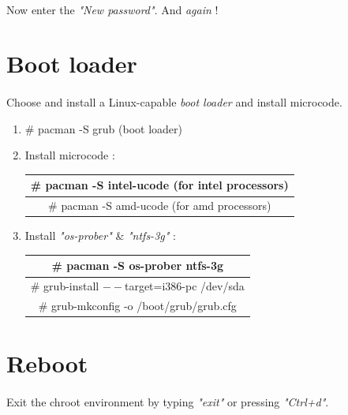 \documentclass[12pt, a4paper]{article}
\begin{document}
\paragraph{}
Now enter the \emph{"New password"}. And \emph{again} !

\section{Boot loader}
\paragraph{}
Choose and install a Linux-capable \textit{boot loader} and install microcode.
\begin{enumerate}
	\item \# pacman -S grub (boot loader)
	\item Install microcode :
	
		\begin{center}
		\begin{tabular}{|c|} \hline
			\# pacman -S intel-ucode (for intel processors)\\ \hline
			\# pacman -S amd-ucode (for amd processors)\\ \hline
		\end{tabular}
	\end{center}
	
	\item Install \emph{"os-prober"} \& \emph{"ntfs-3g"} :
	
			\begin{center}
		\begin{tabular}{|c|} \hline
			\# pacman -S os-prober ntfs-3g\\ \hline
			\# grub-install $--$target=i386-pc /dev/sda\\ \hline
			\# grub-mkconfig -o /boot/grub/grub.cfg\\ \hline
		\end{tabular}
	\end{center}
\end{enumerate}

\section{Reboot}
\paragraph{}
Exit the chroot environment by typing \emph{"exit"} or pressing \emph{"Ctrl+d"}. 
\end{document}
